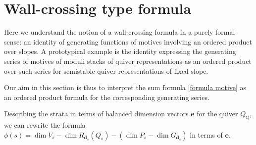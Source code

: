 \documentclass[10pt,a4paper]{amsart}
\numberwithin{equation}{section}
\theoremstyle{definition}
\begin{document}
\section{Wall-crossing type formula}\label{s5}

Here we understand the notion of a wall-crossing formula in a purely formal sense: an identity of generating functions of motives involving an ordered product over slopes. A prototypical example is the identity \cite[Theorem 2.4]{MozIntro} expressing the generating series of motives of moduli stacks of quiver representations as an ordered product over such series for semistable quiver representations of fixed slope.

Our aim in this section is thus to interpret the sum formula \eqref{formula motive} as an ordered product formula for the corresponding generating series.

Describing the strata in terms of balanced dimension vectors $\mathbf{e}$ for the quiver $Q_\mathbb{Q}$, we can rewrite the formula
$
\phi(s) = \dim V_s - \dim R_{\mathbf{d}_s} (Q_s) - (\dim P_s - \dim G_{\mathbf{d}_s})
$
in terms of $\mathbf{e}$.
\end{document}

